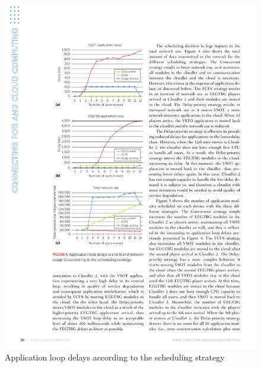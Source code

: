 \documentclass[10pt, pdf, xcolor=pdftex, dvipsnames, table]{beamer}
\begin{document}
\begin{frame}
 	\begin{figure}[htbp]
 		\centerline{\includegraphics[scale=1.2]{images/4b.pdf}}
 		\caption[Application loop delays according to the scheduling strategy]{Application loop delays according to the scheduling strategy}
 	\end{figure}
\end{frame}
\end{document}
